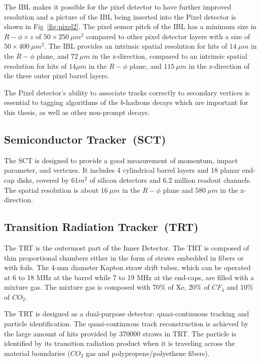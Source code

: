 \par The IBL makes it possible for the pixel detector to have further improved resolution and a picture of the IBL being inserted into the Pixel detector is shown in Fig~\ref{fig:pixel2}. The pixel sensor pitch of the IBL has a minimum size in $R-\phi \times z$ of $50 \times 250~\mu m^2$ compared to other pixel detector layers with a size of $50 \times 400~\mu m^2$. The IBL provides an intrinsic spatial resolution for hits of $14~\mu m$ in the $R-\phi$ plane, and $72~\mu m$ in the z-direction, compared to an intrinsic spatial resolution for hits of $14\mu m$ in the $R-\phi$ plane, and $115~\mu m$ in the z-direction of the three outer pixel barrel layers.

\par The Pixel detector's ability to associate tracks correctly to secondary vertices is essential to tagging algorithms of the $b$-hadrons decays which are important for this thesis, as well as other non-prompt decays.

\subsection{Semiconductor Tracker~(SCT)}
\par The SCT \cite{AHMAD200798} is designed to provide a good measurement of momentum, impact parameter, and vertexes. It includes 4 cylindrical barrel layers and 18 planar end-cap disks, covered by $61 m^2$ of silicon detectors and 6.2 million readout channels. The spatial resolution is about $16~\mu m$ in the $R-\phi$ plane and $580~\mu m$ in the z-direction.

\subsection{Transition Radiation Tracker~(TRT)}
\par The TRT\cite{Abat:2008zza} is the outermost part of the Inner Detector. The TRT is composed of thin proportional chambers either in the form of straws embedded in fibers or with foils. The 4-mm diameter Kapton straw drift tubes, which can be operated at 6 to 18 MHz at the barrel while 7 to 19 MHz at the end-caps, are filled with a mixture gas. The mixture gas is composed with 70\% of Xe, 20\% of $CF_{4}$ and 10\% of $CO_{2}$.

\par The TRT is designed as a dual-purpose detector: quasi-continuous tracking and particle identification. The quasi-continuous track reconstruction is achieved by the large amount of hits provided by 370000 straws in TRT. The particle is identified by its transition radiation product when it is traveling across the material boundaries ($CO_{2}$ gas and polypropene/polyethene fibers). 

